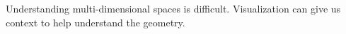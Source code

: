
Understanding multi-dimensional spaces is difficult. Visualization can give
us context to help understand the geometry. 






